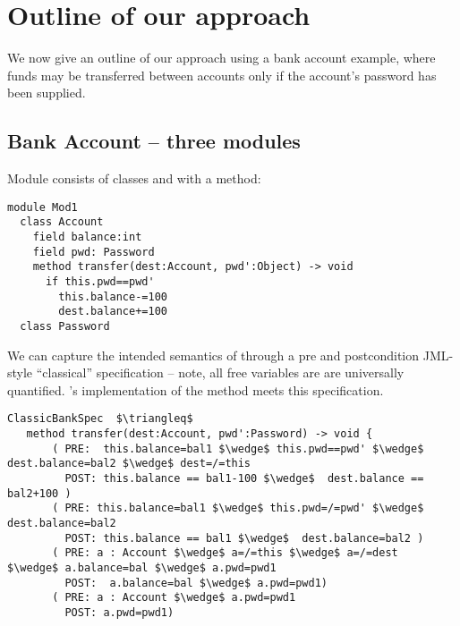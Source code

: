 

\section{Outline of our approach}
\label{s:outline}
We now give an outline of our approach using a bank account example,   where funds may be transferred between accounts only if the account's password has been supplied.


 \subsection{Bank Account -- three modules}
\label{s:bank}
  
Module    consists   of classes   and  
with a  method:
%
%
%
%
% 
\begin{lstlisting}[language=Chainmail, frame=lines]
module Mod1
  class Account
    field balance:int 
    field pwd: Password
    method transfer(dest:Account, pwd':Object) -> void
      if this.pwd==pwd'
        this.balance-=100
        dest.balance+=100
  class Password
\end{lstlisting}
%
\noindent 
We can capture the intended
semantics of %
through  a pre and postcondition 
JML-style\cite{Leavens-etal07}  ``classical''
specification
-- note, all free variables are are universally quantified.
's implementation of the  method meets
this specification.



\begin{lstlisting}[mathescape=true, frame=lines, language=Chainmail]
ClassicBankSpec  $\triangleq$
   method transfer(dest:Account, pwd':Password) -> void {
       ( PRE:  this.balance=bal1 $\wedge$ this.pwd==pwd' $\wedge$ dest.balance=bal2 $\wedge$ dest=/=this 
         POST: this.balance == bal1-100 $\wedge$  dest.balance == bal2+100 )
       ( PRE: this.balance=bal1 $\wedge$ this.pwd=/=pwd' $\wedge$ dest.balance=bal2
         POST: this.balance == bal1 $\wedge$  dest.balance=bal2 )
       ( PRE: a : Account $\wedge$ a=/=this $\wedge$ a=/=dest  $\wedge$ a.balance=bal $\wedge$ a.pwd=pwd1
         POST:  a.balance=bal $\wedge$ a.pwd=pwd1)
       ( PRE: a : Account $\wedge$ a.pwd=pwd1  
         POST: a.pwd=pwd1)       
\end{lstlisting}
 
